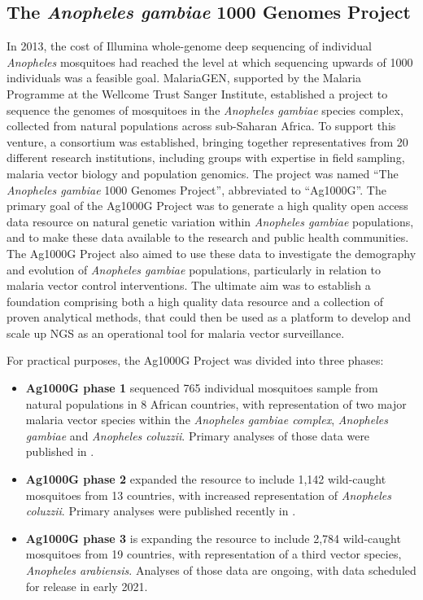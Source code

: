 \begin{refsection}
\section{The \textit{Anopheles gambiae} 1000 Genomes Project}\label{sec:ag1000g}


In 2013, the cost of Illumina whole-genome deep sequencing of individual \textit{Anopheles} mosquitoes had reached the level at which sequencing upwards of 1000 individuals was a feasible goal.
%
MalariaGEN, supported by the Malaria Programme at the Wellcome Trust Sanger Institute, established a project to sequence the genomes of mosquitoes in the \textit{Anopheles gambiae} species complex, collected from natural populations across sub-Saharan Africa.
%
To support this venture, a consortium was established, bringing together representatives from 20 different research institutions, including groups with expertise in field sampling, malaria vector biology and population genomics.
%
The project was named ``The \textit{Anopheles gambiae} 1000 Genomes Project'', abbreviated to ``Ag1000G''.
%
The primary goal of the Ag1000G Project was to generate a high quality open access data resource on natural genetic variation within \textit{Anopheles gambiae} populations, and to make these data available to the research and public health communities.
%
The Ag1000G Project also aimed to use these data to investigate the demography and evolution of \textit{Anopheles gambiae} populations, particularly in relation to malaria vector control interventions.
%
The ultimate aim was to establish a foundation comprising both a high quality data resource and a collection of proven analytical methods, that could then be used as a platform to develop and scale up NGS as an operational tool for malaria vector surveillance.
%

For practical purposes, the Ag1000G Project was divided into three phases:
%
\begin{itemize}
%
\item \textbf{Ag1000G phase 1} sequenced 765 individual mosquitoes sample from natural populations in 8 African countries, with representation of two major malaria vector species within the \textit{Anopheles gambiae complex}, \textit{Anopheles gambiae} and \textit{Anopheles coluzzii}.
%
Primary analyses of those data were published in \textcite{Ag1000G2017}.
%
\item \textbf{Ag1000G phase 2} expanded the resource to include 1,142 wild-caught mosquitoes from 13 countries, with increased representation of \textit{Anopheles coluzzii}.
%
Primary analyses were published recently in \textcite{Ag1000G2020}.
%
\item \textbf{Ag1000G phase 3} is expanding the resource to include 2,784 wild-caught mosquitoes from 19 countries, with representation of a third vector species, \textit{Anopheles arabiensis}.
%
Analyses of those data are ongoing, with data scheduled for release in early 2021.
%
\end{itemize}




\end{refsection}
